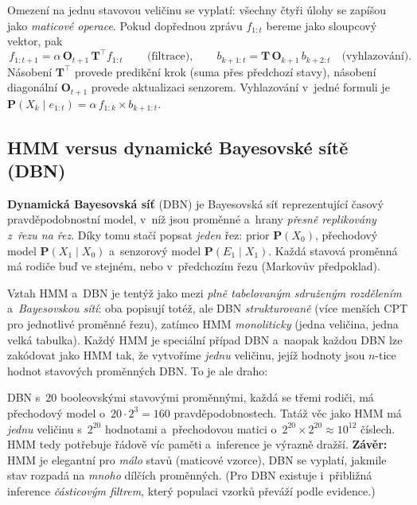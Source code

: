Omezení na jednu stavovou veličinu se vyplatí: všechny čtyři úlohy se zapíšou jako \emph{maticové operace}. Pokud dopřednou zprávu $f_{1:t}$ bereme jako sloupcový vektor, pak
\[
  \boxed{\,f_{1:t+1} = \alpha\,\mathbf{O}_{t+1}\,\mathbf{T}^{\!\top} f_{1:t}\,}\qquad\text{(filtrace)},\qquad
  b_{k+1:t} = \mathbf{T}\,\mathbf{O}_{k+1}\,b_{k+2:t}\quad\text{(vyhlazování)}.
\]
Násobení $\mathbf{T}^{\!\top}$ provede predikční krok (suma přes předchozí stavy), násobení diagonální $\mathbf{O}_{t+1}$ provede aktualizaci senzorem. Vyhlazování v~jedné formuli je $\mathbf{P}(X_k\mid e_{1:t}) = \alpha\, f_{1:k}\times b_{k+1:t}$.

\subsection{HMM versus dynamické Bayesovské sítě (DBN)}

\begin{definice}
\textbf{Dynamická Bayesovská síť} (DBN) je Bayesovská síť reprezentující časový pravděpodobnostní model, v~níž jsou proměnné a~hrany \emph{přesně replikovány z~řezu na řez}. Díky tomu stačí popsat \emph{jeden} řez: prior $\mathbf{P}(X_0)$, přechodový model $\mathbf{P}(X_1\mid X_0)$ a~senzorový model $\mathbf{P}(E_1\mid X_1)$. Každá stavová proměnná má rodiče buď ve stejném, nebo v~předchozím řezu (Markovův předpoklad).
\end{definice}

\begin{intuice}
Vztah HMM a~DBN je tentýž jako mezi \emph{plně tabelovaným sdruženým rozdělením} a~\emph{Bayesovskou sítí}: oba popisují totéž, ale DBN \emph{strukturovaně} (více menších CPT pro jednotlivé proměnné řezu), zatímco HMM \emph{monoliticky} (jedna veličina, jedna velká tabulka). Každý HMM je speciální případ DBN a~naopak každou DBN lze zakódovat jako HMM tak, že vytvoříme \emph{jednu} veličinu, jejíž hodnoty jsou $n$-tice hodnot stavových proměnných DBN. To je ale draho:
\end{intuice}

\begin{poznamka}
DBN s~$20$ booleovskými stavovými proměnnými, každá se třemi rodiči, má přechodový model o~$20\cdot 2^3 = 160$ pravděpodobnostech. Tatáž věc jako HMM má \emph{jednu} veličinu s~$2^{20}$ hodnotami a~přechodovou matici o~$2^{20}\times 2^{20}\approx 10^{12}$ číslech. HMM tedy potřebuje řádově víc paměti a~inference je výrazně dražší. \textbf{Závěr:} HMM je elegantní pro \emph{málo} stavů (maticové vzorce), DBN se vyplatí, jakmile stav rozpadá na \emph{mnoho} dílčích proměnných. (Pro DBN existuje i~přibližná inference \emph{částicovým filtrem}, který populaci vzorků převáží podle evidence.)
\end{poznamka}

